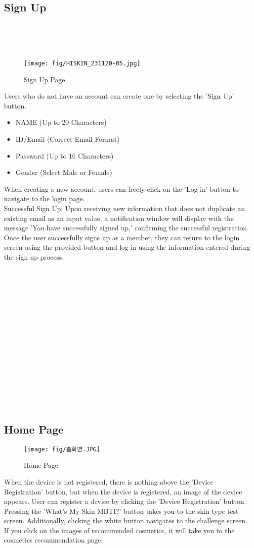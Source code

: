 \documentclass[conference]{IEEEtran}
\begin{document}
\subsection{Sign Up} \\ \\ \\ 
\begin{figure}[h]
    \centering
    \texttt{[image: fig/HISKIN\_231120-05.jpg]}
    \label{fig:Sign Up Page}
    \caption{Sign Up Page} 
    \end{figure}
Users who do not have an account can create one by selecting the 'Sign Up' button.
\begin{itemize}
    \item NAME (Up to 20 Characters)
    \item ID/Email (Correct Email Format)
    \item Password (Up to 16 Characters)
    \item Gender (Select Male or Female)
\end{itemize}
When creating a new account, users can freely click on the 'Log in' button to navigate to the login page. \\
Successful Sign Up: Upon receiving new information that does not duplicate an existing email as an input value, a notification window will display with the message 'You have successfully signed up,' confirming the successful registration. Once the user successfully signs up as a member, they can return to the login screen using the provided button and log in using the information entered during the sign up process.\\ \\ \\ \\ \\ \\ \\ \\ \\ \\ \\ \\ \\ \\ \\ \\

\subsection{Home Page}
\begin{figure}[h]
    \centering
    \texttt{[image: fig/홈화면.JPG]}
    \label{fig:Home Page}
    \caption{Home Page} 
    \end{figure}
When the device is not registered, there is nothing above the 'Device Registration' button, but when the device is registered, an image of the device appears. User can register a device by clicking the 'Device Registration' button. Pressing the 'What's My Skin MBTI?' button takes you to the skin type test screen. Additionally, clicking the white button navigates to the challenge screen. If you click on the images of recommended cosmetics, it will take you to the cosmetics recommendation page.
\end{document}
